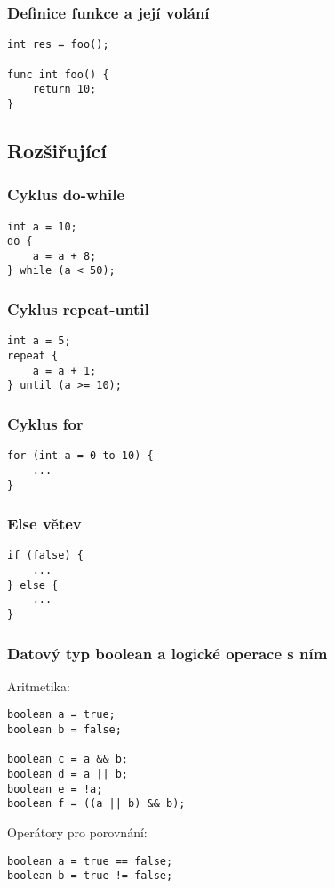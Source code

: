 \documentclass[czech, oth, kiv, he, iso690numb, viewonly]{fasthesis}
\begin{document}
\subsubsection{Definice funkce a její volání}
\begin{lstlisting}[]
int res = foo();

func int foo() {
    return 10;
}
\end{lstlisting}



\subsection{Rozšiřující}

\subsubsection{Cyklus do-while}
\begin{lstlisting}[]
int a = 10;
do {
    a = a + 8;
} while (a < 50);
\end{lstlisting}


\subsubsection{Cyklus repeat-until}
\begin{lstlisting}[]
int a = 5;
repeat {
    a = a + 1;
} until (a >= 10);
\end{lstlisting}

\subsubsection{Cyklus for}
\begin{lstlisting}[]
for (int a = 0 to 10) {
    ...
}
\end{lstlisting}

\subsubsection{Else větev}
\begin{lstlisting}[]
if (false) {
    ...
} else {
    ...
}
\end{lstlisting}

\subsubsection{Datový typ boolean a logické operace s ním}
Aritmetika:
\begin{lstlisting}[]
boolean a = true;
boolean b = false;

boolean c = a && b;
boolean d = a || b;
boolean e = !a;
boolean f = ((a || b) && b);
\end{lstlisting}
Operátory pro porovnání:
\begin{lstlisting}[]
boolean a = true == false;
boolean b = true != false;
\end{lstlisting}
\end{document}
